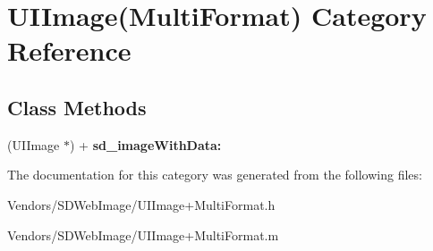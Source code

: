 \hypertarget{category_u_i_image_07_multi_format_08}{}\section{U\+I\+Image(Multi\+Format) Category Reference}
\label{category_u_i_image_07_multi_format_08}
\subsection*{Class Methods}
\begin{DoxyCompactItemize}
\item 
\hypertarget{category_u_i_image_07_multi_format_08_a86aa344c6f90663de6aff4dd9737d52a}{}(U\+I\+Image $\ast$) + {\bfseries sd\+\_\+image\+With\+Data\+:}\label{category_u_i_image_07_multi_format_08_a86aa344c6f90663de6aff4dd9737d52a}

\end{DoxyCompactItemize}


The documentation for this category was generated from the following files\+:\begin{DoxyCompactItemize}
\item 
Vendors/\+S\+D\+Web\+Image/U\+I\+Image+\+Multi\+Format.\+h\item 
Vendors/\+S\+D\+Web\+Image/U\+I\+Image+\+Multi\+Format.\+m\end{DoxyCompactItemize}
